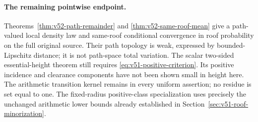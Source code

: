 \paragraph{The remaining pointwise endpoint.}
Theorems~\ref{thm:v52-path-remainder} and
\ref{thm:v52-same-roof-mean} give a path-valued local density law and
same-roof conditional convergence in roof probability on the full
original source. Their path topology is weak, expressed by
bounded-Lipschitz distance; it is not path-space total variation.
The scalar two-sided essential-height theorem still requires
\eqref{eq:v51-positive-criterion}. Its positive incidence and clearance
components have not been shown small in height here. The arithmetic
transition kernel remains in every uniform assertion; no residue is
set equal to one. The fixed-radius positive-class specialization uses
precisely the unchanged arithmetic lower bounds already established
in Section~\ref{sec:v51-roof-minorization}.
